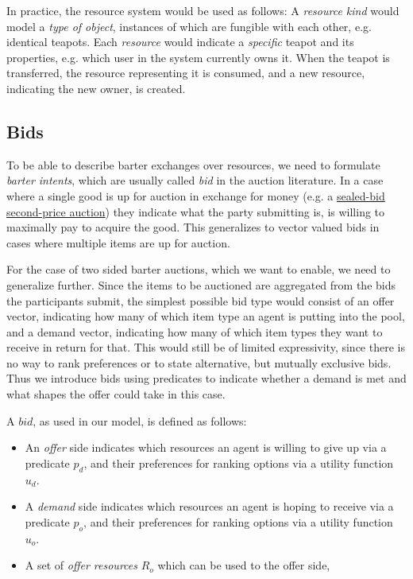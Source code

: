 In practice, the resource system would be used as follows: A \textit{resource kind} would model a \textit{type of object}, instances of which are fungible with each other, e.g. identical teapots. Each \textit{resource} would indicate a \textit{specific} teapot and its properties, e.g. which user in the system currently owns it. When the teapot is transferred, the resource representing it is consumed, and a new resource, indicating the new owner, is created.

\subsection{Bids}

To be able to describe barter exchanges over resources, we need to formulate \textit{barter intents}, which are usually called \textit{bid} in the auction literature. In a case where a single good is up for auction in exchange for money (e.g. a \href{https://en.wikipedia.org/wiki/Vickrey_auction}{sealed-bid second-price auction}) they indicate what the party submitting is, is willing to maximally pay to acquire the good. This generalizes to vector valued bids in cases where multiple items are up for auction.

For the case of two sided barter auctions, which we want to enable, we need to generalize further. Since the items to be auctioned are aggregated from the bids the participants submit, the simplest possible bid type would consist of an offer vector, indicating how many of which item type an agent is putting into the pool, and a demand vector, indicating how many of which item types they want to receive in return for that. This would still be of limited expressivity, since there is no way to rank preferences or to state alternative, but mutually exclusive bids. Thus we introduce bids using predicates to indicate whether a demand is met and what shapes the offer could take in this case.

A $bid$, as used in our model, is defined as follows:

\begin{itemize}
    \item An \textit{offer} side indicates which resources an agent is willing to give up via a predicate $p_d$, and their preferences for ranking options via a utility function $u_d$.
    \item A \textit{demand} side indicates which resources an agent is hoping to receive via a predicate $p_o$, and their preferences for ranking options via a utility function $u_o$.
    \item A set of \textit{offer resources} $R_o$ which can be used to the offer side, 
\end{itemize}


